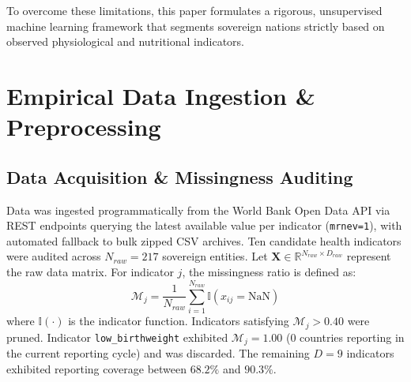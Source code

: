 \documentclass[conference]{IEEEtran}
\begin{document}
To overcome these limitations, this paper formulates a rigorous, unsupervised machine learning framework that segments sovereign nations strictly based on observed physiological and nutritional indicators.

\section{Empirical Data Ingestion \& Preprocessing}

\subsection{Data Acquisition \& Missingness Auditing}
Data was ingested programmatically from the World Bank Open Data API via REST endpoints querying the latest available value per indicator (\texttt{mrnev=1}), with automated fallback to bulk zipped CSV archives. Ten candidate health indicators were audited across $N_{raw} = 217$ sovereign entities. Let $\mathbf{X} \in \mathbb{R}^{N_{raw} \times D_{raw}}$ represent the raw data matrix. For indicator $j$, the missingness ratio is defined as:
\begin{equation}
\mathcal{M}_j = \frac{1}{N_{raw}} \sum_{i=1}^{N_{raw}} \mathbb{I}(x_{ij} = \text{NaN})
\end{equation}
where $\mathbb{I}(\cdot)$ is the indicator function. Indicators satisfying $\mathcal{M}_j > 0.40$ were pruned. Indicator \texttt{low\_birthweight} exhibited $\mathcal{M}_j = 1.00$ ($0$ countries reporting in the current reporting cycle) and was discarded. The remaining $D = 9$ indicators exhibited reporting coverage between $68.2\%$ and $90.3\%$.
\end{document}
